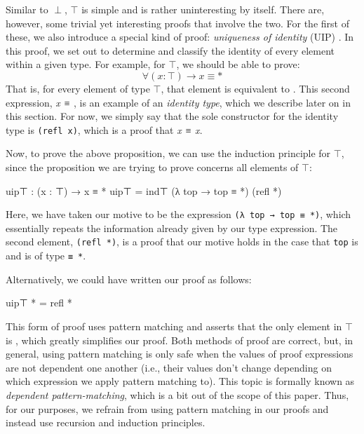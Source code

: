 \documentclass[12pt]{article}
\begin{document}
Similar to \(\perp\), \(\top\) is simple and is rather uninteresting by itself.
There are, however, some trivial yet interesting proofs that involve the two.
For the first of these, we also introduce a special kind of proof: {\it uniqueness
of identity} (UIP) \cite{}. In this proof, we set out to determine and classify
the identity of every element within a given type. For example, for \(\top\), we
should be able to prove:
$$\forall (x : \top) \rightarrow x ≡ *$$
That is, for every element of type \(\top\), that element is equivalent to {\tt *}.
This second expression, {\it x ≡} {\tt *}, is an example of an {\it identity type},
which we describe later on in this section. For now, we simply say that the
sole constructor for the identity type is {\tt (refl x)}, which is a proof that
{\it x ≡ x}.

Now, to prove the above proposition, we can use the induction principle for
\(\top\), since the proposition we are trying to prove concerns all elements
of \(\top\):
\begin{center}
\begin{minipage}{0.9\textwidth}
\begin{code}
uip⊤ : (x : ⊤) → x ≡ *
uip⊤ = ind⊤ (λ top → top ≡ *) (refl *)
\end{code}
\end{minipage}
\end{center}
Here, we have taken our motive to be the expression {\tt (λ top → top ≡ *)},
which essentially repeats the information already given by our type expression.
The second element, {\tt (refl *)}, is a proof that our motive holds in the case that
{\tt top} is {\tt *} and is of type {\tt * ≡ *}.

Alternatively, we could have written our proof as follows:
\begin{center}
\begin{minipage}{0.9\textwidth}
\begin{code}
uip⊤ * = refl *
\end{code}
\end{minipage}
\end{center}
This form of proof uses pattern matching and asserts that the only element in
\(\top\) is {\tt *}, which greatly simplifies our proof. Both methods of proof
are correct, but, in general, using pattern matching is only safe when the
values of proof expressions are not dependent one another (i.e., their values
don't change depending on which expression we apply pattern matching to). This
topic is formally known as {\it dependent pattern-matching}, which is a bit
out of the scope of this paper. Thus, for our purposes, we refrain from using
pattern matching in our proofs and instead use recursion and induction
principles.
\end{document}
